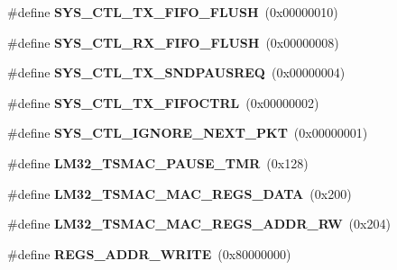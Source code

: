 \begin{DoxyCompactItemize}
\item 
\mbox{\label{group__lm32__tsmac_gad5bbe8b4f2adf653f0e6367f8eef717d}} 
\#define {\bfseries S\+Y\+S\+\_\+\+C\+T\+L\+\_\+\+T\+X\+\_\+\+F\+I\+F\+O\+\_\+\+F\+L\+U\+SH}~(0x00000010)
\item 
\mbox{\label{group__lm32__tsmac_gae65344fdf7538356d8c1dcb6f6840e2f}} 
\#define {\bfseries S\+Y\+S\+\_\+\+C\+T\+L\+\_\+\+R\+X\+\_\+\+F\+I\+F\+O\+\_\+\+F\+L\+U\+SH}~(0x00000008)
\item 
\mbox{\label{group__lm32__tsmac_ga9e5f7382fbbcbef52acd1d2f5b0d548b}} 
\#define {\bfseries S\+Y\+S\+\_\+\+C\+T\+L\+\_\+\+T\+X\+\_\+\+S\+N\+D\+P\+A\+U\+S\+R\+EQ}~(0x00000004)
\item 
\mbox{\label{group__lm32__tsmac_ga4e6e13128441d14f3a58a60e93a87aba}} 
\#define {\bfseries S\+Y\+S\+\_\+\+C\+T\+L\+\_\+\+T\+X\+\_\+\+F\+I\+F\+O\+C\+T\+RL}~(0x00000002)
\item 
\mbox{\label{group__lm32__tsmac_gaeb93f9361c331d9d9889fe5b6d4e7927}} 
\#define {\bfseries S\+Y\+S\+\_\+\+C\+T\+L\+\_\+\+I\+G\+N\+O\+R\+E\+\_\+\+N\+E\+X\+T\+\_\+\+P\+KT}~(0x00000001)
\item 
\mbox{\label{group__lm32__tsmac_ga56a55ff6c4d09d9643d9424746355a73}} 
\#define {\bfseries L\+M32\+\_\+\+T\+S\+M\+A\+C\+\_\+\+P\+A\+U\+S\+E\+\_\+\+T\+MR}~(0x128)
\item 
\mbox{\label{group__lm32__tsmac_ga4e992d7d2b344f8225632061ebea6a6a}} 
\#define {\bfseries L\+M32\+\_\+\+T\+S\+M\+A\+C\+\_\+\+M\+A\+C\+\_\+\+R\+E\+G\+S\+\_\+\+D\+A\+TA}~(0x200)
\item 
\mbox{\label{group__lm32__tsmac_ga82078c5c0651713f22dad995dccc2a45}} 
\#define {\bfseries L\+M32\+\_\+\+T\+S\+M\+A\+C\+\_\+\+M\+A\+C\+\_\+\+R\+E\+G\+S\+\_\+\+A\+D\+D\+R\+\_\+\+RW}~(0x204)
\item 
\mbox{\label{group__lm32__tsmac_ga72772515b102a3efd839f23d936942ae}} 
\#define {\bfseries R\+E\+G\+S\+\_\+\+A\+D\+D\+R\+\_\+\+W\+R\+I\+TE}~(0x80000000)
\item 

\end{DoxyCompactItemize}
